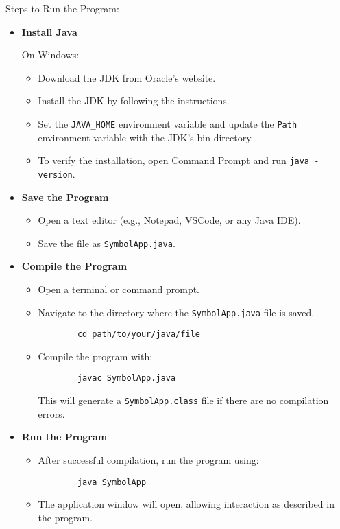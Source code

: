 Steps to Run the Program:
\begin{itemize}
    \item \textbf{Install Java}

    On Windows:
    \begin{itemize}
        \item Download the JDK from Oracle's website.
        \item Install the JDK by following the instructions.
        \item Set the \texttt{JAVA\_HOME} environment variable and update the \texttt{Path} environment variable with the JDK's bin directory.
        \item To verify the installation, open Command Prompt and run \texttt{java -version}.
    \end{itemize}

    \item \textbf{Save the Program}
    \begin{itemize}
        \item Open a text editor (e.g., Notepad, VSCode, or any Java IDE).
        \item Save the file as \texttt{SymbolApp.java}.
    \end{itemize}

    \item \textbf{Compile the Program}
    \begin{itemize}
        \item Open a terminal or command prompt.
        \item Navigate to the directory where the \texttt{SymbolApp.java} file is saved.
        \begin{verbatim}
        cd path/to/your/java/file
        \end{verbatim}
        \item Compile the program with:
        \begin{verbatim}
        javac SymbolApp.java
        \end{verbatim}
        This will generate a \texttt{SymbolApp.class} file if there are no compilation errors.
    \end{itemize}

    \item \textbf{Run the Program}
    \begin{itemize}
        \item After successful compilation, run the program using:
        \begin{verbatim}
        java SymbolApp
        \end{verbatim}
        \item The application window will open, allowing interaction as described in the program.
    \end{itemize}
\end{itemize}

